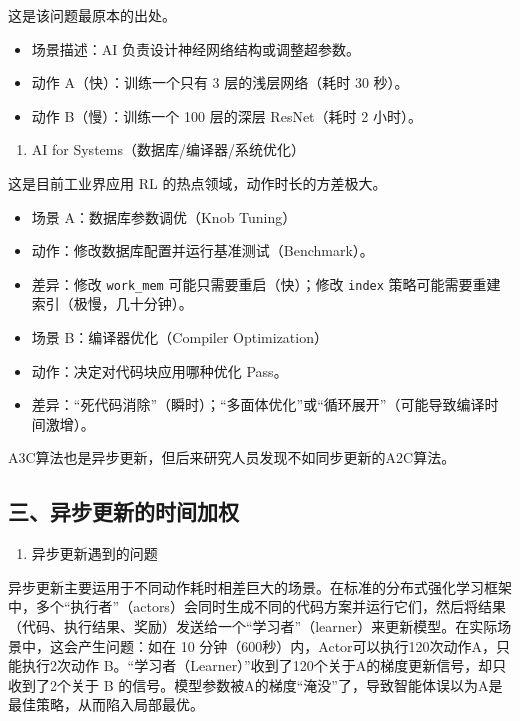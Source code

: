这是该问题最原本的出处。

\begin{itemize}
\tightlist
\item
  场景描述：AI 负责设计神经网络结构或调整超参数。
\item
  动作 A（快）：训练一个只有 3 层的浅层网络（耗时 30 秒）。
\item
  动作 B（慢）：训练一个 100 层的深层 ResNet（耗时 2 小时）。
\end{itemize}

\begin{enumerate}
\def\labelenumi{\arabic{enumi}.}
\setcounter{enumi}{1}
\tightlist
\item
  AI for Systems（数据库/编译器/系统优化）
\end{enumerate}

这是目前工业界应用 RL 的热点领域，动作时长的方差极大。

\begin{itemize}
\tightlist
\item
  场景 A：数据库参数调优（Knob Tuning）
\item
  动作：修改数据库配置并运行基准测试（Benchmark）。
\item
  差异：修改 \texttt{work\_mem} 可能只需要重启（快）；修改 \texttt{index} 策略可能需要重建索引（极慢，几十分钟）。
\item
  场景 B：编译器优化（Compiler Optimization）
\item
  动作：决定对代码块应用哪种优化 Pass。
\item
  差异：``死代码消除''（瞬时）；``多面体优化''或``循环展开''（可能导致编译时间激增）。
\end{itemize}

A3C算法也是异步更新，但后来研究人员发现不如同步更新的A2C算法。

\hypertarget{ux4e09ux5f02ux6b65ux66f4ux65b0ux7684ux65f6ux95f4ux52a0ux6743}{%
\subsection{三、异步更新的时间加权}\label{ux4e09ux5f02ux6b65ux66f4ux65b0ux7684ux65f6ux95f4ux52a0ux6743}}

\begin{enumerate}
\def\labelenumi{\arabic{enumi}.}
\tightlist
\item
  异步更新遇到的问题
\end{enumerate}

异步更新主要运用于不同动作耗时相差巨大的场景。在标准的分布式强化学习框架中，多个``执行者''（actors）会同时生成不同的代码方案并运行它们，然后将结果（代码、执行结果、奖励）发送给一个``学习者''（learner）来更新模型。在实际场景中，这会产生问题：如在 10 分钟（600秒）内，Actor可以执行120次动作A，只能执行2次动作 B。``学习者（Learner）''收到了120个关于A的梯度更新信号，却只收到了2个关于 B 的信号。模型参数被A的梯度``淹没''了，导致智能体误以为A是最佳策略，从而陷入局部最优。

